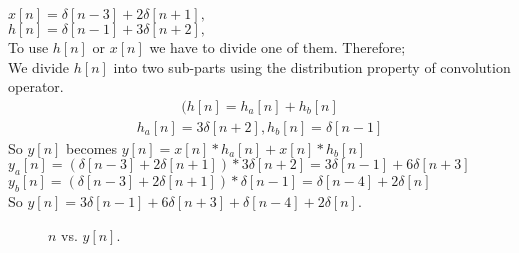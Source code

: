 \documentclass[10pt,a4paper, margin=1in]{article}
\begin{document}
\begin{enumerate}
\begin{enumerate}
    \(x[n] = \delta[n-3] + 2\delta[n+1], \)\\
    \(h[n] = \delta[n-1] + 3\delta[n+2], \)\\
    To use \(h[n]\)  or \(x[n]\)  we have to divide one of them.
    Therefore;\\
    We divide \(h[n]\) into two sub-parts using the distribution property of convolution operator. \\
     \begin{align}
        (h[n] = h_a[n] + h_b[n]
    \end{align}
    \begin{align}
        h_a[n] =3\delta[n+2] , h_b[n] = \delta[n-1]
    \end{align}
    So \(y[n]\) becomes \(y[n] = x[n] \ast h_a[n] + x[n] \ast h_b[n]\)\\
    \(y_a[n] = (\delta[n-3] + 2\delta[n+1]) \ast 3\delta[n+2] = 3\delta[n-1] + 6\delta[n+3] \)\\
    \(y_b[n] = (\delta[n-3] + 2\delta[n+1]) \ast \delta[n-1] = \delta[n-4] + 2\delta[n] \)\\
    So \(y[n] =  3\delta[n-1] + 6\delta[n+3] + \delta[n-4] + 2\delta[n].\)\\
    \begin{figure} [h!]
        \centering
        \caption{$n$ vs. $y[n]$.}
        \label{fig:q3}
    \end{figure}
    

\end{enumerate}
\end{enumerate}
\end{document}
